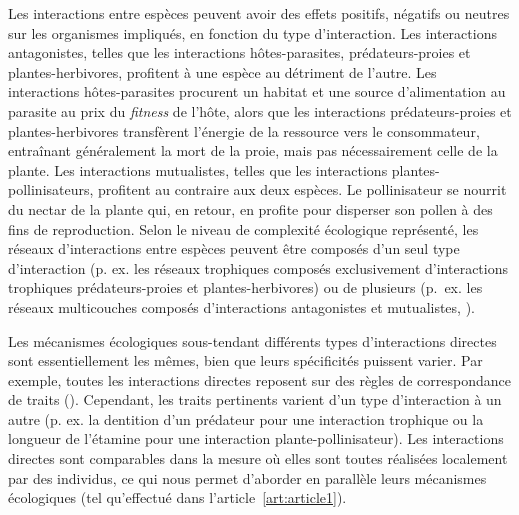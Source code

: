 Les interactions entre espèces peuvent avoir des effets positifs, négatifs ou
neutres sur les organismes impliqués, en fonction du type d'interaction. Les
interactions antagonistes, telles que les interactions hôtes-parasites,
prédateurs-proies et plantes-herbivores, profitent à une espèce au détriment de
l'autre. Les interactions hôtes-parasites procurent un habitat et une source
d'alimentation au parasite au prix du \textit{fitness} de l'hôte, alors que les
interactions prédateurs-proies et plantes-herbivores transfèrent l'énergie de la
ressource vers le consommateur, entraînant généralement la mort de la proie,
mais pas nécessairement celle de la plante. Les interactions mutualistes, telles
que les interactions plantes-pollinisateurs, profitent au contraire aux deux
espèces. Le pollinisateur se nourrit du nectar de la plante qui, en retour, en
profite pour disperser son pollen à des fins de reproduction. Selon le niveau de
complexité écologique représenté, les réseaux d'interactions entre espèces
peuvent être composés d'un seul type d'interaction (p. ex. les réseaux
trophiques composés exclusivement d'interactions trophiques prédateurs-proies et
plantes-herbivores) ou de plusieurs (p.~ex. les réseaux multicouches composés
d'interactions antagonistes et mutualistes, \cite{Pilosof2017Multilayer}). 
 
Les mécanismes écologiques sous-tendant différents types d'interactions directes
sont essentiellement les mêmes, bien que leurs spécificités puissent varier. Par
exemple, toutes les interactions directes reposent sur des règles de
correspondance de traits (\cite{Poisot2015Species}). Cependant, les traits
pertinents varient d'un type d'interaction à un autre (p. ex. la dentition d'un
prédateur pour une interaction trophique ou la longueur de l'étamine pour une
interaction plante-pollinisateur). Les interactions directes sont comparables
dans la mesure où elles sont toutes réalisées localement par des individus, ce
qui nous permet d'aborder en parallèle leurs mécanismes écologiques (tel
qu'effectué dans l'article~\ref{art:article1}).

